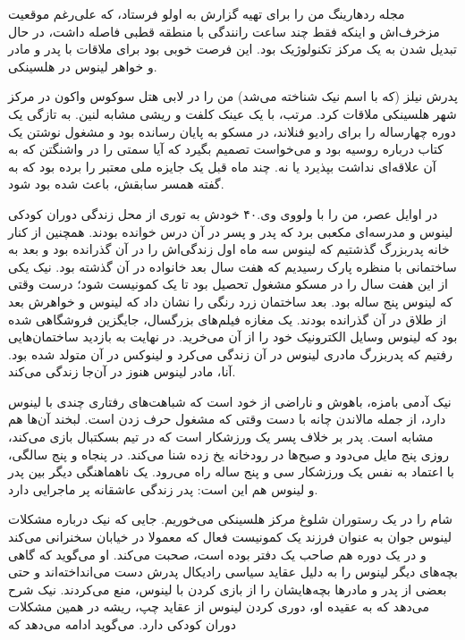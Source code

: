 \begin{journal}
مجله ردهارینگ من را برای تهیه گزارش به
اولو فرستاد، که علی‌رغم موقعیت مزخرف‌اش و اینکه فقط چند
ساعت رانندگی با منطقه قطبی فاصله داشت، در حال تبدیل شدن به یک مرکز
تکنولوژیک بود. این فرصت خوبی بود برای ملاقات با پدر و مادر و خواهر
لینوس در هلسینکی.

پدرش نیلز (که با اسم نیک شناخته می‌شد) من را در لابی هتل سوکوس
واکون در مرکز شهر هلسینکی ملاقات
کرد. مرتب، با یک عینک‌ کلفت و ریشی مشابه لنین. به تازگی یک دوره
چهارساله را برای رادیو فنلاند، در مسکو به پایان رسانده بود و مشغول
نوشتن یک کتاب درباره روسیه بود و می‌خواست تصمیم بگیرد که آیا سمتی را در
واشنگتن که به آن علاقه‌ای نداشت بپذیرد یا نه. چند ماه قبل یک جایزه ملی
معتبر را برده بود که به گفته همسر سابقش، باعث شده بود  شود.

در اوایل عصر، من را با ولووی وی.۴۰ خودش به توری از محل زندگی دوران
کودکی لینوس و مدرسه‌ای مکعبی برد که پدر و پسر در آن درس خوانده
بودند. همچنین از کنار خانه پدربزرگ گذشتیم که لینوس سه ماه اول زندگی‌اش
را در آن گذرانده بود و بعد به ساختمانی با منظره پارک رسیدیم که هفت سال
بعد خانواده در آن گذشته بود. نیک یکی از این هفت سال را در مسکو مشغول
تحصیل بود تا یک کمونیست شود؛ درست وقتی که لینوس پنج ساله بود. بعد
ساختمان زرد رنگی را نشان داد که لینوس و خواهرش بعد از طلاق در آن
گذرانده بودند. یک مغازه فیلم‌های بزرگسال، جایگزین فروشگاهی شده بود که
لینوس وسایل الکترونیک خود را از آن می‌خرید. در نهایت به بازدید
ساختمان‌هایی رفتیم که پدربزرگ مادری لینوس در آن زندگی می‌کرد و لینوکس در
آن متولد شده بود. آنا،‌ مادر لینوس هنوز در آن‌جا زندگی می‌کند.

نیک آدمی بامزه، باهوش و ناراضی از خود است که شباهت‌های رفتاری چندی با
لینوس دارد، از جمله مالاندن چانه با دست وقتی که مشغول حرف زدن
است. لبخند آن‌ها هم مشابه است. پدر بر خلاف پسر یک ورزشکار است که در تیم
بسکتبال بازی می‌کند، روزی پنج مایل می‌دود و صبح‌ها در رودخانه یخ زده شنا
می‌کند. در پنجاه و پنج سالگی، با اعتماد به نفس یک ورزشکار سی و پنج ساله
راه می‌رود. یک ناهماهنگی دیگر بین پدر و لینوس هم این است: پدر زندگی
عاشقانه پر ماجرایی دارد.

شام را در یک رستوران شلوغ مرکز هلسینکی می‌خوریم. جایی که نیک درباره
مشکلات لینوس جوان به عنوان فرزند یک کمونیست فعال که معمولا در خیابان
سخنرانی می‌کند و در یک دوره هم صاحب یک دفتر بوده است، صحبت می‌کند. او
می‌گوید که گاهی بچه‌های دیگر لینوس را به دلیل عقاید سیاسی رادیکال پدرش
دست می‌انداخته‌اند و حتی بعضی از پدر و مادرها بچه‌هایشان را از بازی کردن
با لینوس، منع می‌کردند. نیک شرح می‌دهد که به عقیده او، دوری کردن لینوس
از عقاید چپ، ریشه در همین مشکلات دوران کودکی دارد. می‌گوید  ادامه می‌دهد که 


\end{journal}
